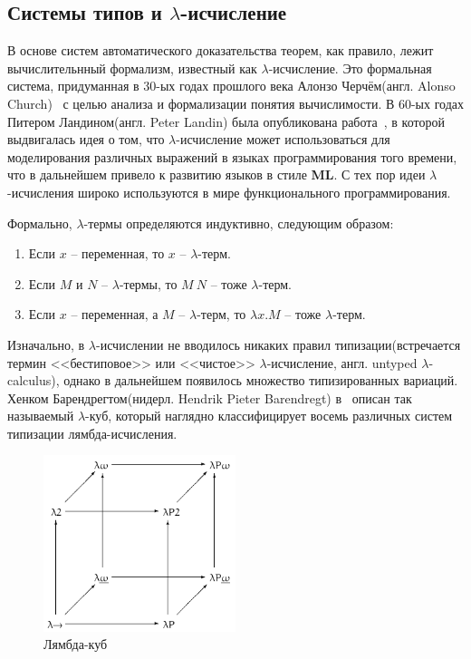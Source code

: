 \subsection{Системы типов и \texorpdfstring{$\lambda$}{лямбда}-исчисление}

В основе систем автоматического доказательства теорем, как правило, лежит вычислительнный формализм, известный как $\lambda$-исчисление. Это формальная система, придуманная в 30-ых годах прошлого века Алонзо Черчём(англ. Alonso Church)~\cite{church1936unsolvable} с целью анализа и формализации понятия вычислимости. В 60-ых годах Питером Ландином(англ. Peter Landin) была опубликована работа~\cite{landin1964mechanical}, в которой выдвигалась идея о том, что $\lambda$-исчисление может использоваться для моделирования различных выражений в языках программирования того времени, что в дальнейшем привело к развитию языков в стиле \textbf{ML}. С тех пор идеи $\lambda$-исчисления широко используются в мире функционального программирования.

Формально, $\lambda$-термы определяются индуктивно, следующим образом:

\begin{enumerate}
  \item Если $x$ -- переменная, то $x$ -- $\lambda$-терм.
  \item Если $M$ и $N$ -- $\lambda$-термы, то $M\ N$ -- тоже $\lambda$-терм.
  \item Если $x$ -- переменная, а $M$ -- $\lambda$-терм, то $\lambda x.M$ -- тоже $\lambda$-терм.
\end{enumerate}

Изначально, в $\lambda$-исчислении не вводилось никаких правил типизации(встречается термин <<бестиповое>> или <<чистое>> $\lambda$-исчисление, англ. untyped $\lambda$-calculus), однако в дальнейшем появилось множество типизированных вариаций. Хенком Барендрегтом(нидерл. Hendrik Pieter Barendregt) в~\cite{barendregt1993lambda} описан так называемый $\lambda$-куб, который наглядно классифицирует восемь различных систем типизации лямбда-исчисления.

\begin{figure}[H]
  \centering
  \includegraphics[width=0.5\textwidth]{img/Lambda_cube.png}
  \caption{Лямбда-куб\protect\footnotemark}
\end{figure}

